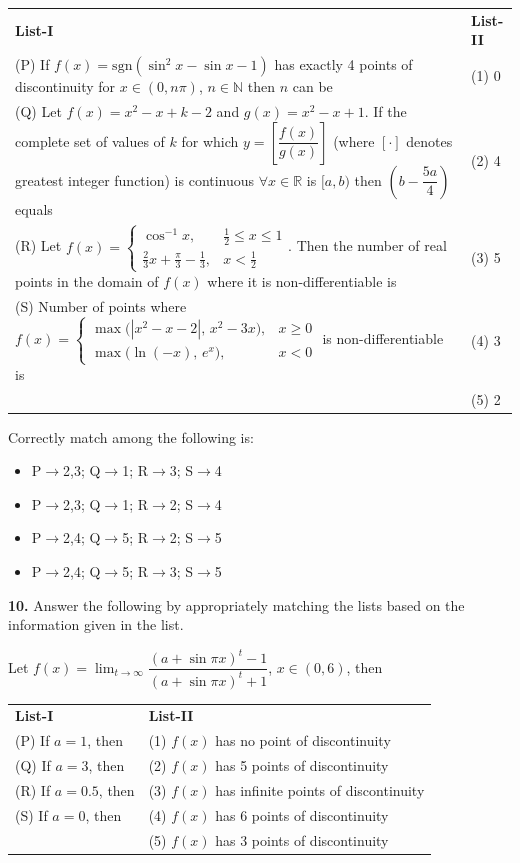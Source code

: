 \documentclass[10pt,twocolumn]{extarticle}
\renewcommand{\arraystretch}{1.15}
\newenvironment{qoptions}{\begin{itemize}[leftmargin=1.8em,itemsep=2pt,topsep=2pt,label={}]}{\end{itemize}}
\newcommand{\opt}[2]{\item[({#1})] {#2}}
\begin{document}
\begin{center}
\renewcommand{\arraystretch}{1.25}
\begin{tabular}{@{}p{5.6cm}p{1.6cm}@{}}
\textbf{List-I} & \textbf{List-II} \\
(P) If $f(x)=\text{sgn}(\sin^2x-\sin x-1)$ has exactly 4 points of discontinuity for $x\in(0,n\pi)$, $n\in\mathbb{N}$ then $n$ can be & (1) 0 \\[6pt]
(Q) Let $f(x)=x^2-x+k-2$ and $g(x)=x^2-x+1$. If the complete set of values of $k$ for which $y=\left[\dfrac{f(x)}{g(x)}\right]$ (where $[\cdot]$ denotes greatest integer function) is continuous $\forall x\in\mathbb{R}$ is $[a,b)$ then $\left(b-\dfrac{5a}{4}\right)$ equals & (2) 4 \\[10pt]
(R) Let $f(x)=\begin{cases}\cos^{-1}x, & \tfrac12\le x\le1\\ \tfrac{2}{3}x+\tfrac{\pi}{3}-\tfrac13, & x<\tfrac12\end{cases}$. Then the number of real points in the domain of $f(x)$ where it is non-differentiable is & (3) 5 \\[10pt]
(S) Number of points where $f(x)=\begin{cases}\max\!\big(|x^2-x-2|,\,x^2-3x\big), & x\ge0\\ \max\!\big(\ln(-x),\,e^x\big), & x<0\end{cases}$ is non-differentiable is & (4) 3 \\
 & (5) 2 \\
\end{tabular}
\renewcommand{\arraystretch}{1.15}
\end{center}

Correctly match among the following is:
\begin{qoptions}
\opt{A}{P$\to$2,3; Q$\to$1; R$\to$3; S$\to$4}
\opt{B}{P$\to$2,3; Q$\to$1; R$\to$2; S$\to$4}
\opt{C}{P$\to$2,4; Q$\to$5; R$\to$2; S$\to$5}
\opt{D}{P$\to$2,4; Q$\to$5; R$\to$3; S$\to$5}
\end{qoptions}

\textbf{10.} Answer the following by appropriately matching the lists based on the information given in the list.

Let $f(x)=\displaystyle\lim_{t\to\infty}\dfrac{(a+\sin\pi x)^t-1}{(a+\sin\pi x)^t+1}$, $x\in(0,6)$, then

\begin{center}
\renewcommand{\arraystretch}{1.25}
\begin{tabular}{@{}p{2.6cm}p{4.6cm}@{}}
\textbf{List-I} & \textbf{List-II} \\
(P) If $a=1$, then & (1) $f(x)$ has no point of discontinuity \\[4pt]
(Q) If $a=3$, then & (2) $f(x)$ has 5 points of discontinuity \\[4pt]
(R) If $a=0.5$, then & (3) $f(x)$ has infinite points of discontinuity \\[4pt]
(S) If $a=0$, then & (4) $f(x)$ has 6 points of discontinuity \\[4pt]
 & (5) $f(x)$ has 3 points of discontinuity \\
\end{tabular}
\renewcommand{\arraystretch}{1.15}
\end{center}
\end{document}
